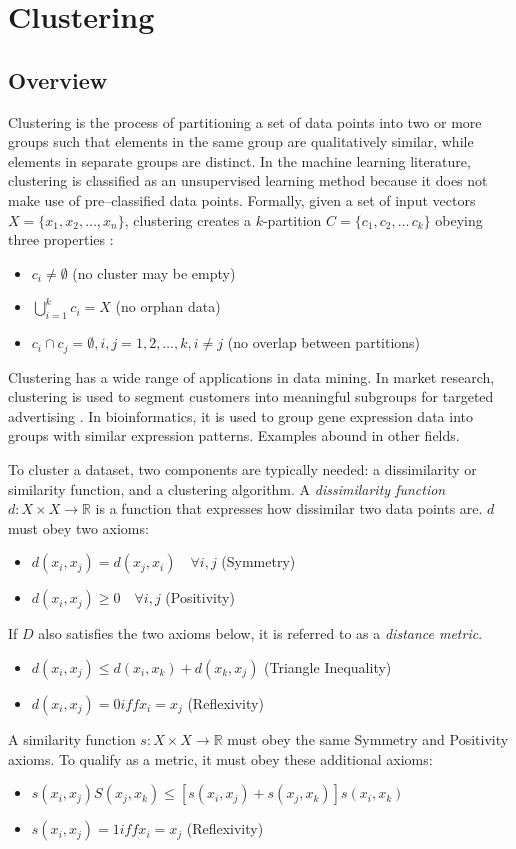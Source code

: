 \chapter{Clustering}

\section{Overview}
Clustering is the process of partitioning a set of data points into two or more groups such that elements in the same group are qualitatively similar, while elements in separate groups are distinct. In the machine learning literature, clustering is classified as an unsupervised learning method because it does not make use of pre--classified data points. Formally, given a set of input vectors $X = \{x_1, x_2, \dots, x_n \}$, clustering creates a $k$-partition $C = \{c_1, c_2, \dots\, c_k\}$ obeying three properties \citep{xuwunsch}:
	\begin{itemize}
		\item $c_i \neq \emptyset$ (no cluster may be empty)
		\item $\bigcup_{i=1}^k c_i = X$ (no orphan data)
		\item $c_i \cap c_j = \emptyset, i, j = 1, 2, \dots, k, i \neq j$ (no overlap between partitions)
	\end{itemize}
Clustering has a wide range of applications in data mining. In market research, clustering is used to segment customers into meaningful subgroups for targeted advertising \citep{gan2007}. In bioinformatics, it is used to group gene expression data into groups with similar expression patterns. Examples abound in other fields.

To cluster a dataset, two components are typically needed: a dissimilarity or similarity function, and a clustering algorithm. A \textit{dissimilarity function} $d: X \times X \rightarrow \mathbb{R}$ is a function that expresses how dissimilar two data points are. $d$ must obey two axioms:
	\begin{itemize}
		\item $d(x_i, x_j) = d(x_j, x_i) \quad \forall i, j$ (Symmetry)
		\item $d(x_i, x_j) \geq 0 \quad \forall i, j$ (Positivity)
	\end{itemize}
If $D$ also satisfies the two axioms below, it is referred to as a \textit{distance metric}.
	\begin{itemize}
		\item ${d(x_i, x_j)} \leq d(x_i, x_k) + d(x_k, x_j)$ (Triangle Inequality)
		\item $d(x_i, x_j) = 0 iff x_i = x_j$ (Reflexivity)
	\end{itemize}
A similarity function $s: X \times X \rightarrow \mathbb{R}$ must obey the same Symmetry and Positivity axioms. To qualify as a metric, it must obey these additional axioms:
	\begin{itemize}
		\item $s(x_i, x_j)S(x_j, x_k) \leq [s(x_i, x_j) + s(x_j, x_k)]s(x_i, x_k)$
		\item $s(x_i, x_j) = 1 iff x_i = x_j$ (Reflexivity)
	\end{itemize}
